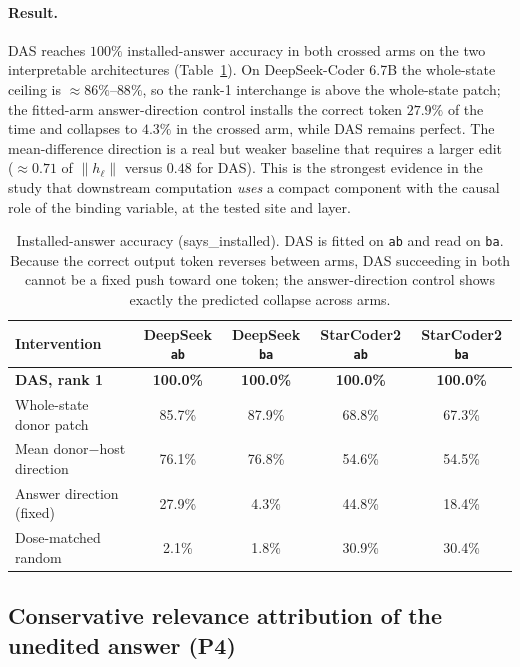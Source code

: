 \documentclass[10pt]{article}
\newcommand{\hb}{h_{\ell}}
\newcommand{\says}{\textsf{says\_installed}}
\newcommand{\code}[1]{\texttt{#1}}
\begin{document}
\paragraph{Result.} DAS reaches $100\%$ installed-answer accuracy in both crossed
arms on the two interpretable architectures (Table~\ref{tab:das}). On
DeepSeek-Coder 6.7B the whole-state ceiling is $\approx 86\%$--$88\%$, so the
rank-1 interchange is above the whole-state patch; the fitted-arm answer-direction
control installs the correct token $27.9\%$ of the time and collapses to $4.3\%$
in the crossed arm, while DAS remains perfect. The mean-difference direction is a
real but weaker baseline that requires a larger edit ($\approx 0.71$ of
$\|\hb\|$ versus $0.48$ for DAS). This is the strongest evidence in the study that
downstream computation \emph{uses} a compact component with the causal role of the
binding variable, at the tested site and layer.

\begin{table}[t]
\centering
\small
\caption{Installed-answer accuracy (\says{}). DAS is fitted on \code{ab} and read
on \code{ba}. Because the correct output token reverses between arms, DAS
succeeding in both cannot be a fixed push toward one token; the answer-direction
control shows exactly the predicted collapse across arms.}
\label{tab:das}
\begin{tabular}{@{}lcccc@{}}
\toprule
Intervention & DeepSeek \code{ab} & DeepSeek \code{ba} & StarCoder2 \code{ab} & StarCoder2 \code{ba} \\
\midrule
\textbf{DAS, rank 1}       & \textbf{100.0\%} & \textbf{100.0\%} & \textbf{100.0\%} & \textbf{100.0\%} \\
Whole-state donor patch    & 85.7\% & 87.9\% & 68.8\% & 67.3\% \\
Mean donor$-$host direction& 76.1\% & 76.8\% & 54.6\% & 54.5\% \\
Answer direction (fixed)   & 27.9\% & 4.3\%  & 44.8\% & 18.4\% \\
Dose-matched random        & 2.1\%  & 1.8\%  & 30.9\% & 30.4\% \\
\bottomrule
\end{tabular}
\end{table}

\subsection{Conservative relevance attribution of the unedited answer (P4)}
\label{sec:rlens}
\end{document}
